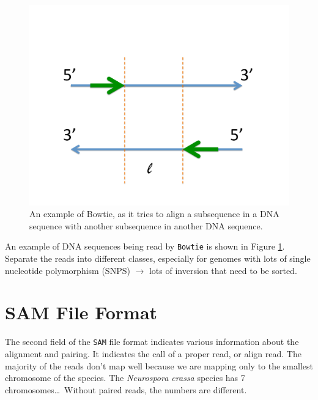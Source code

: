 \begin{figure}[h]
\centering 
\includegraphics[width=6in]{./bioinformatics/pics/bowtie_example}
\caption{An example of Bowtie, as it tries to align a subsequence in a DNA sequence with another subsequence in another DNA sequence.}
\label{fig:BowtieExample}
\end{figure}

An example of DNA sequences being read by {\tt Bowtie} is shown in Figure \ref{fig:BowtieExample}. \\


Separate the reads into different classes, especially for genomes with lots of single nucleotide polymorphism (SNPS) $\rightarrow$ lots of inversion that need to be sorted.













\section{SAM File Format}
\label{sec:SAMFileFormat}

The second field of the {\tt SAM} file format indicates various information about the alignment and pairing. It indicates the call of a proper read, or align read. The majority of the reads don't map well because we are mapping only to the smallest chromosome of the species. The {\it Neurospora crassa} species has 7 chromosomes\dots\ Without paired reads, the numbers are different. \\

